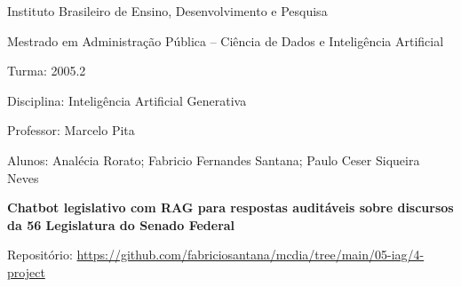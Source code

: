 \documentclass[11pt,a4paper]{article}
\begin{document}
\begin{center}
{\large Instituto Brasileiro de Ensino, Desenvolvimento e Pesquisa}\par
Mestrado em Administração Pública -- Ciência de Dados e Inteligência Artificial\par
Turma: 2005.2\par
Disciplina: Inteligência Artificial Generativa\par
Professor: Marcelo Pita\par
Alunos: Analécia Rorato; Fabricio Fernandes Santana; Paulo Ceser Siqueira Neves

\vspace{1.5em}
{\LARGE \textbf{Chatbot legislativo com RAG para respostas auditáveis sobre discursos da 56\textordfeminine{} Legislatura do Senado Federal}}\par

\vspace{0.75em}
Repositório: \url{https://github.com/fabriciosantana/mcdia/tree/main/05-iag/4-project}
\end{center}










% 
% 
% 
\end{document}
